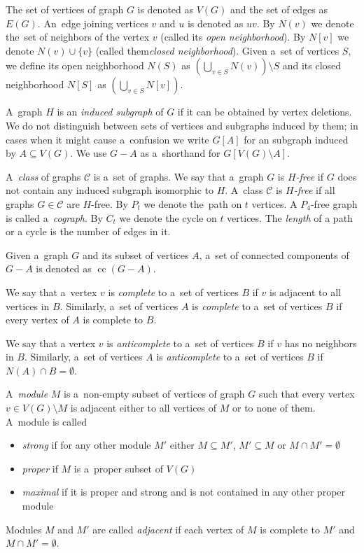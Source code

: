 \documentclass[11pt,a4paper]{article}
\DeclareMathOperator{\cc}{cc}
\theoremstyle{definition}
\renewcommand{\varnothing}{\emptyset}
\def\C{\mathcal{C}}
\newcommand{\prz}[2][]{\todo[color=olive!80,#1]{{\textbf{prz:} #2}}}
\begin{document}

The set of vertices of graph $G$ is denoted as $V(G)$ and the set of edges as $E(G)$. An~edge joining vertices $v$ and $u$ is denoted as $uv$.
By $N(v)$ we denote the~set of neighbors of the vertex $v$ (called its {\it open neighborhood}).
By $N[v]$ we denote $N(v)\cup \{v\}$ (called them{\it closed neighborhood}). 
Given a~set of vertices $S$, we define its open neighborhood $N(S)$ as $\left(\bigcup_{v\in S} N(v)\right)\setminus S$ and its closed neighborhood $N[S]$ as $\left(\bigcup_{v\in S} N[v]\right)$.

A~graph $H$ is an {\it induced subgraph} of $G$ if it can be obtained by vertex deletions.
We do not distinguish between sets of vertices and subgraphs induced by them; in cases when it might cause a~confusion we write $G[A]$ for an subgraph induced by $A\subseteq V(G)$.
We use $G-A$ as a~shorthand for $G[V(G) \setminus A]$.

A~{\it class} of graphs $\C$ is a~set of graphs.
We say that a~graph $G$ is $H${\it -free} if $G$ does not contain any induced subgraph isomorphic to $H$. A~class $\C$ is $H${\it -free} if all graphs $G\in \C$ are $H$-free. By $P_t$ we denote the~path on $t$ vertices. A $P_4$-free graph is called a~{\it cograph}.  By $C_t$ we denote the cycle on $t$ vertices. The {\it length} of a path or a cycle is the number of edges in it.

Given a~graph $G$ and its subset of vertices $A$, a~set of connected components of $G-A$ is denoted as $\cc(G-A)$.

We say that a~vertex $v$ is {\it complete} to a~set of vertices $B$ if $v$ is adjacent to all vertices in $B$. Similarly, a~set of vertices $A$ is {\it complete} to a~set of vertices $B$ if every vertex of $A$ is complete to $B$.

We say that a vertex $v$ is {\it anticomplete} to a~set of vertices $B$ if $v$ has no neighbors in $B$. Similarly, a~set of vertices $A$ is {\it anticomplete} to a~set of vertices $B$ if $N(A)\cap B = \varnothing$.

A~{\it module} $M$ is a~non-empty subset of vertices of graph $G$ such that every vertex $v\in V(G)\setminus M$ is adjacent either to all vertices of $M$ or to none of them. A~module is called 
\begin{itemize}
    \item {\it strong} if for any other module $M'$ either $M\subseteq M'$, $M'\subseteq M$ or $M\cap M' = \varnothing$
    \item {\it proper} if $M$ is a~proper subset of $V(G)$
    \item {\it maximal} if it is proper and strong and is not contained in any other proper module 
\end{itemize}
Modules $M$ and $M'$ are called {\it adjacent} if each vertex of $M$ is complete to $M'$ and $M\cap M'=\varnothing$.
\end{document}
